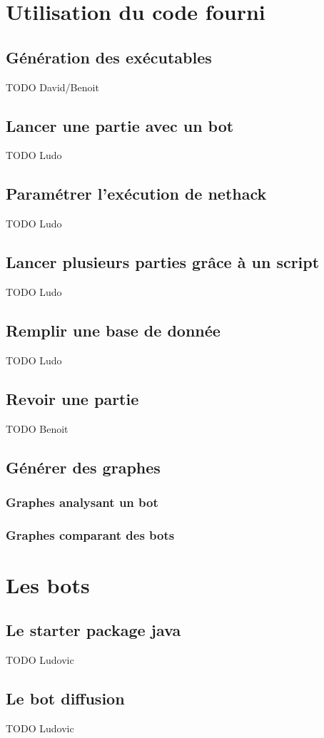 \documentclass[10pt,a4paper]{report}
\begin{document}
\chapter{Utilisation du code fourni}
\section{Génération des exécutables}
TODO David/Benoit
\section{Lancer une partie avec un bot}
TODO Ludo
\section{Paramétrer l'exécution de nethack}
TODO Ludo
\section{Lancer plusieurs parties grâce à un script}
TODO Ludo
\section{Remplir une base de donnée}
TODO Ludo
\section{Revoir une partie}
TODO Benoit
\section{Générer des graphes}
\subsection{Graphes analysant un bot}
\subsection{Graphes comparant des bots}

\chapter{Les bots}
\section{Le starter package java}
TODO Ludovic
\section{Le bot diffusion}
TODO Ludovic
\end{document}
